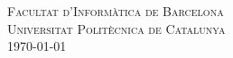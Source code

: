 \begin{titlepage}
\textsc{\LARGE Facultat d'Informàtica de Barcelona}\\[0.5cm]
\textsc{\Large Universitat Politècnica de Catalunya}\\[0.5cm] %



{\large \today}\\[2cm] %


 

\vfill %

\end{titlepage}